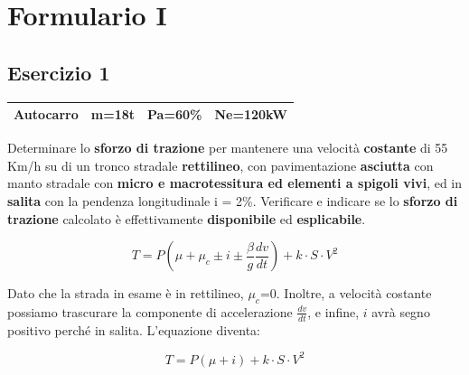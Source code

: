 \documentclass[
a4paper,
12pt, 
twoside]{scrbook}
\begin{document}
	\tableofcontents
	\chapter{Formulario I}
    \section{Esercizio 1}
	{
	 \centering
	  \begin{tabular}{|c|c|c|c|} 
		\hline
		\rule[-1ex]{0pt}{2.5ex}  Autocarro & m=18t & Pa=60\% & Ne=120kW \\
		\hline
	  \end{tabular}\par
    }
    
    \leavevmode\newline
    
    \begin{boxK}
    	Determinare lo \textbf{sforzo di trazione} per mantenere una velocità \textbf{costante} di 55 Km/h su di un tronco stradale \textbf{rettilineo}, con pavimentazione \textbf{asciutta} con manto stradale con \textbf{micro e macrotessitura ed elementi a spigoli vivi}, ed in \textbf{salita} con la pendenza longitudinale i = 2\%. Verificare e indicare se lo \textbf{sforzo di trazione} calcolato è effettivamente \textbf{disponibile} ed \textbf{esplicabile}. 
    \end{boxK}
    
    \begin{equation}\label{eq:trazione}
    	T=P(\mu+\mu_{c}\pm i\pm \frac{\beta}{g}\frac{dv}{dt})+k\cdot S\cdot V^{2}
    \end{equation}
    
    \begin{boxF}
    	Dato che la strada in esame è in rettilineo, $\mu_{c}$=0. Inoltre, a velocità costante possiamo trascurare la componente di accelerazione $\frac{dv}{dt}$, e infine, $i$ avrà segno positivo perché in salita. L'equazione diventa:
    \end{boxF}
    
    \begin{equation}\label{eq:trazione2}
    	T=P(\mu+i)+k\cdot S\cdot V^{2}
    \end{equation}
    
    \leavevmode\newline
    
\end{document}
